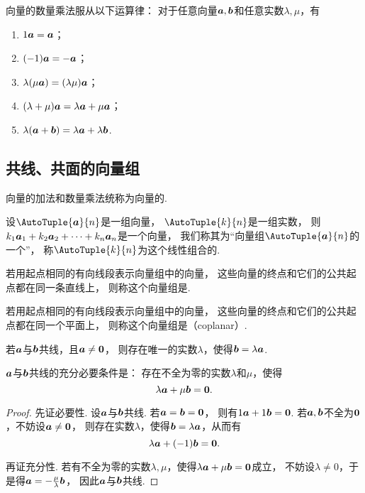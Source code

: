 向量的数量乘法服从以下运算律：
对于任意向量\(\boldsymbol{a},\boldsymbol{b}\)和任意实数\(\lambda,\mu\)，有
\begin{enumerate}
	\item \(1 \boldsymbol{a} = \boldsymbol{a}\)；
	\item \((-1) \boldsymbol{a} = -\boldsymbol{a}\)；
	\item \(\lambda(\mu \boldsymbol{a}) = (\lambda \mu) \boldsymbol{a}\)；
	\item \((\lambda+\mu) \boldsymbol{a} = \lambda \boldsymbol{a} + \mu \boldsymbol{a}\)；
	\item \(\lambda (\boldsymbol{a}+\boldsymbol{b}) = \lambda \boldsymbol{a} + \lambda \boldsymbol{b}\).
\end{enumerate}

\subsection{共线、共面的向量组}
向量的加法和数量乘法统称为向量的.

设\(\AutoTuple{\vb{a}}{n}\)是一组向量，
\(\AutoTuple{k}{n}\)是一组实数，
则\(k_1 \boldsymbol{a}_1 + k_2 \boldsymbol{a}_2 + \dotsb + k_n \boldsymbol{a}_n\)是一个向量，
我们称其为“向量组\(\AutoTuple{\vb{a}}{n}\)的一个”，
称\(\AutoTuple{k}{n}\)为这个线性组合的.

\begin{definition}
若用起点相同的有向线段表示向量组中的向量，
这些向量的终点和它们的公共起点都在同一条直线上，
则称这个向量组是.

若用起点相同的有向线段表示向量组中的向量，
这些向量的终点和它们的公共起点都在同一个平面上，
则称这个向量组是（coplanar）.
\end{definition}

\begin{theorem}
若\(\boldsymbol{a}\)与\(\boldsymbol{b}\)共线，且\(\boldsymbol{a}\neq\boldsymbol{0}\)，
则存在唯一的实数\(\lambda\)，使得\(\boldsymbol{b} = \lambda \boldsymbol{a}\).
\end{theorem}

\begin{theorem}\label{theorem:解析几何.两向量共线的充分必要条件1}
\(\boldsymbol{a}\)与\(\boldsymbol{b}\)共线的充分必要条件是：
存在不全为零的实数\(\lambda\)和\(\mu\)，使得\[
	\lambda \boldsymbol{a} + \mu \boldsymbol{b} = \boldsymbol{0}.
\]
\begin{proof}
先证必要性.
设\(\boldsymbol{a}\)与\(\boldsymbol{b}\)共线.
若\(\boldsymbol{a}=\boldsymbol{b}=\boldsymbol{0}\)，
则有\(1\boldsymbol{a}+1\boldsymbol{b}=\boldsymbol{0}\).
若\(\boldsymbol{a},\boldsymbol{b}\)不全为\(\boldsymbol{0}\)，不妨设\(\boldsymbol{a}\neq\boldsymbol{0}\)，
则存在实数\(\lambda\)，使得\(\boldsymbol{b}=\lambda\boldsymbol{a}\)，从而有\[
	\lambda\boldsymbol{a}+(-1)\boldsymbol{b}=\boldsymbol{0}.
\]

再证充分性.
若有不全为零的实数\(\lambda,\mu\)，使得\(\lambda \boldsymbol{a} + \mu \boldsymbol{b} = \boldsymbol{0}\)成立，
不妨设\(\lambda\neq0\)，于是得\(\boldsymbol{a}=-\frac{\mu}{\lambda}\boldsymbol{b}\)，
因此\(\boldsymbol{a}\)与\(\boldsymbol{b}\)共线.
\end{proof}
\end{theorem}

